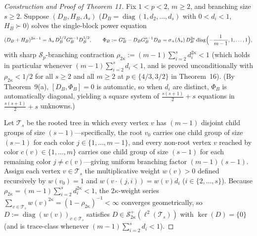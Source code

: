 \documentclass[10pt,letterpaper]{article}
\newcommand{\Sp}{\mathcal{S}_p}
\newcommand{\diag}{\operatorname{diag}}
\begin{document}
\begin{proof}[Construction and Proof of Theorem 11]
Fix $1 < p < 2$, $m \ge 2$, and branching size $s \ge 2$. Suppose $(D_B, H_B, \Lambda_s)$ ($D_B = \diag(1, d_2, \dots, d_s)$ with $0 < d_i < 1$, $H_B \succ 0$) solves the single-block power equation
\[
  (D_B + H_B)^{2\kappa - 1} = \Lambda_s\, D_B^{1/2} G_B^{\kappa-1} D_B^{1/2},
  \qquad \Phi_B := G_B^\kappa - D_B G_B^{\kappa-1} D_B = \sigma_+(\Lambda_s)\,D_B^{2\kappa}\diag\Bigl(-\frac{1}{m-1}, 1, \dots, 1\Bigr),
\]
with sharp $\Sp$-branching contraction $\rho_{2\kappa} := (m - 1)\sum_{i=2}^s d_i^{2\kappa} < 1$ (which holds in particular whenever $(m - 1)\sum_{i=2}^s d_i < 1$, and is proved unconditionally with $\rho_{2\kappa} < 1/2$ for all $s \ge 2$ and all $m \ge 2$ at $p \in \{4/3, 3/2\}$ in Theorem~16). (By Theorem~9(a), $[D_B, \Phi_B] = 0$ is automatic, so when $d_i$ are distinct, $\Phi_B$ is automatically diagonal, yielding a square system of $\frac{s(s+1)}{2} + s$ equations in $\frac{s(s+1)}{2} + s$ unknowns.)

Let $\mathcal{T}_s$ be the rooted tree in which every vertex $v$ has $(m - 1)$ disjoint child groups of size $(s - 1)$—specifically, the root $v_0$ carries one child group of size $(s - 1)$ for each color $j \in \{1,\dots,m-1\}$, and every non-root vertex $v$ reached by color $c(v) \in \{1,\dots,m\}$ carries one child group of size $(s - 1)$ for each remaining color $j \neq c(v)$—giving uniform branching factor $(m - 1)(s - 1)$. Assign each vertex $v \in \mathcal{T}_s$ the multiplicative weight $w(v) > 0$ defined recursively by $w(v_0) = 1$ and $w(v \cdot (j, i)) = w(v) d_i$ ($i \in \{2,\dots,s\}$). Because $\rho_{2\kappa} = (m-1)\sum_{i=2}^s d_i^{2\kappa} < 1$, the $2\kappa$-weight series $\sum_{v \in \mathcal{T}_s} w(v)^{2\kappa} = (1 - \rho_{2\kappa})^{-1} < \infty$ converges geometrically, so $D := \diag(w(v))_{v \in \mathcal{T}_s}$ satisfies $D \in \mathcal{S}_{2\kappa}^+(\ell^2(\mathcal{T}_s))$ with $\ker(D) = \{0\}$ (and is trace-class whenever $(m-1)\sum_{i=2}^s d_i < 1$).


\end{proof}
\end{document}
